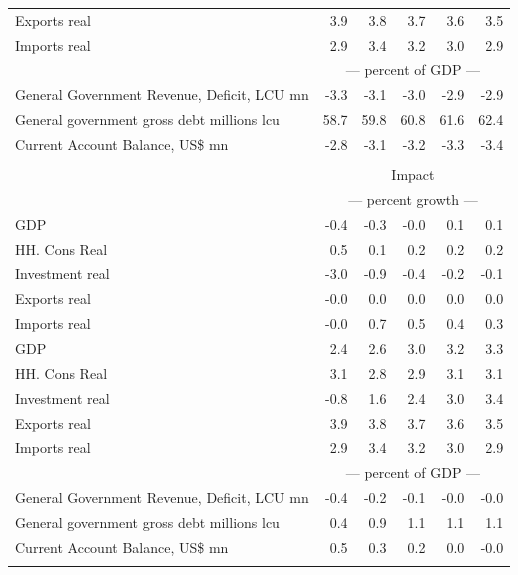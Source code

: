 \documentclass{article}
\begin{document}
\begin{table}[ht]
\begin{tabular}{lrrrrr}
Exports real & 3.9 & 3.8 & 3.7 & 3.6 & 3.5 \\
Imports real & 2.9 & 3.4 & 3.2 & 3.0 & 2.9 \\
&\multicolumn{5}{c}{--- percent of GDP ---}           \\
General Government Revenue, Deficit, LCU mn & -3.3 & -3.1 & -3.0 & -2.9 & -2.9 \\
General government gross debt millions lcu & 58.7 & 59.8 & 60.8 & 61.6 & 62.4 \\
Current Account Balance, US\$ mn & -2.8 & -3.1 & -3.2 & -3.3 & -3.4 \\
&\multicolumn{5}{c}{  }           \\
&\multicolumn{5}{c}{Impact}           \\
&\multicolumn{5}{c}{--- percent growth ---}           \\
GDP & -0.4 & -0.3 & -0.0 & 0.1 & 0.1 \\
HH. Cons Real & 0.5 & 0.1 & 0.2 & 0.2 & 0.2 \\
Investment real & -3.0 & -0.9 & -0.4 & -0.2 & -0.1 \\
Exports real & -0.0 & 0.0 & 0.0 & 0.0 & 0.0 \\
Imports real & -0.0 & 0.7 & 0.5 & 0.4 & 0.3 \\
GDP & 2.4 & 2.6 & 3.0 & 3.2 & 3.3 \\
HH. Cons Real & 3.1 & 2.8 & 2.9 & 3.1 & 3.1 \\
Investment real & -0.8 & 1.6 & 2.4 & 3.0 & 3.4 \\
Exports real & 3.9 & 3.8 & 3.7 & 3.6 & 3.5 \\
Imports real & 2.9 & 3.4 & 3.2 & 3.0 & 2.9 \\
&\multicolumn{5}{c}{--- percent of GDP ---}           \\
General Government Revenue, Deficit, LCU mn & -0.4 & -0.2 & -0.1 & -0.0 & -0.0 \\
General government gross debt millions lcu & 0.4 & 0.9 & 1.1 & 1.1 & 1.1 \\
Current Account Balance, US\$ mn & 0.5 & 0.3 & 0.2 & 0.0 & -0.0 \\
&\multicolumn{5}{c}{  }           \\
\bottomrule
\end{tabular}
\end{table}
\end{document}
